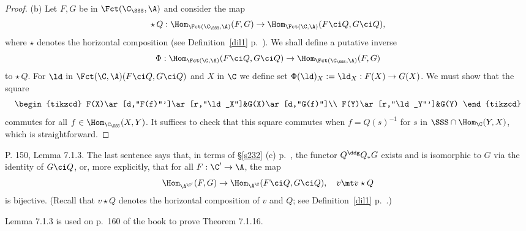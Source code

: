 \documentclass[12pt]{article}
\theoremstyle{remark}
\theoremstyle{definition}
\begin{document}
\begin{s}
\begin{proof}
\nn(b) Let $F,G$ be in $\Fct(\C_\SSS,\A)$ and consider the map 
$$
\star\,Q:\Hom_{\Fct(\C_\SSS,\A)}(F,G)\to\Hom_{\Fct(\C,\A)}(F\ci Q,G\ci Q),
$$ 
where $\star$ denotes the horizontal composition (see Definition~\ref{dil1} p.~). We shall define a putative inverse 
$$
\Phi:\Hom_{\Fct(\C,\A)}(F\ci Q,G\ci Q)\to\Hom_{\Fct(\C_\SSS,\A)}(F,G)
$$ 
to $\star\,Q$. For $\ld$ in $\Fct(\C,\A)(F\ci Q,G\ci Q)$ and $X$ in $\C$ we define set $\Phi(\ld)_X:=\ld_X:F(X)\to G(X)$. We must show that the square 
$$
\begin{tikzcd}
F(X)\ar[d,"F(f)"']\ar[r,"\ld_X"]&G(X)\ar[d,"G(f)"]\\ 
F(Y)\ar[r,"\ld_Y"']&G(Y)
\end{tikzcd} 
$$ 
commutes for all $f\in\Hom_{\C_\SSS}(X,Y)$. It suffices to check that this square commutes when $f=Q(s)^{-1}$ for $s$ in $\SSS\cap\Hom_\C(Y,X)$, which is straightforward.
\end{proof}
\end{s}




\begin{s}
P. 150, Lemma 7.1.3. The last sentence says that, in terms of \S\ref{s232} (c) p.~, the functor $Q^\ddg Q_*G$ exists and is isomorphic to $G$ via the identity of $G\ci Q$, or, more explicitly, that for all $F:\C'\to\A$, the map 
$$
\Hom_{\A^{\C'}}(F,G)\to\Hom_{\A^\C}(F\ci Q,G\ci Q),\quad v\mt v\star Q
$$ 
is bijective. (Recall that $v\star Q$ denotes the horizontal composition of $v$ and $Q$; see Definition~\ref{dil1} p.~.)

Lemma 7.1.3 is used on p.~160 of the book to prove Theorem 7.1.16. %
\end{s}
\end{document}
